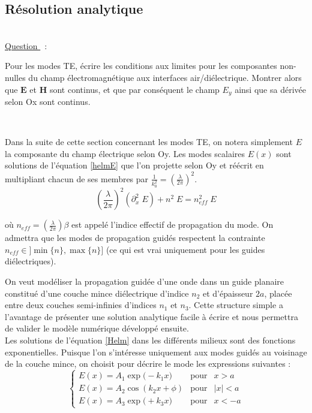 \documentclass[a4paper, 12pt]{article}
\newcounter{nquestion}
\newenvironment{question}[1]{
	\refstepcounter{nquestion}
	\vspace{2mm}\\
	\noindent \underline{Question \thenquestion}~:\vspace{-3mm}
	\begin{leftbar} \noindent #1}
	{\end{leftbar} \vspace{2mm}\\}
\begin{document}
\subsection{Résolution analytique}

\begin{question}
Pour les modes TE, écrire les conditions aux limites pour les composantes non-nulles du champ électromagnétique aux interfaces air/diélectrique. Montrer alors que $\textbf{E}$ et $ \textbf{H}$ sont continus, et que par conséquent le champ $E_y$ ainsi que sa dérivée selon Ox sont continus.
\end{question}

Dans la suite de cette section concernant les modes TE, on notera simplement $E$ la composante du champ électrique selon Oy. Les modes scalaires $E(x)$ sont solutions de  l'équation \eqref{helmE} que l'on projette selon Oy et réécrit  en multipliant chacun de ses membres par $\frac{1}{k_0^2}=\left(\frac{\lambda}{2 \pi} \right)^2$.
\begin{equation}
\left(\frac{\lambda}{2 \pi} \right)^2 \left(\partial_x^2 \; E \right)  + n^2 \; E=n_{ef\!f}^2 \; E
\label{Helm}
\end{equation}

\noindent où $n_{ef\!f} = \left(\frac{\lambda}{2 \pi} \right) \beta$ est appelé l'indice effectif de propagation du mode. On admettra que les modes de propagation guidés respectent la contrainte $n_{ef\!f} \in ]\min \{n \}, \max \{n \}]$ (ce qui est vrai uniquement pour les guides diélectriques).

On veut modéliser la propagation guidée d'une onde dans un guide planaire constitué d'une couche mince diélectrique d'indice $n_2$ et d'épaisseur $2a$, placée entre deux couches semi-infinies d'indices $n_1$ et $n_3$. Cette structure simple a l'avantage de présenter une solution analytique facile à écrire et nous permettra de valider le modèle numérique développé ensuite.\\

Les solutions de l'équation \eqref{Helm} dans les différents milieux sont des fonctions exponentielles. Puisque l'on s'intéresse uniquement aux modes guidés au voisinage de la couche mince, on choisit pour décrire le mode les expressions suivantes :
\begin{equation} \label{eq:ETE}
\left\{
  \begin{array}{lcl}
E(x)=A_1\exp \big(-k_1 x \big)  & \text{pour} &  x>a \\
E(x)=A_2\cos(k_2 x + \phi)  & \text{pour} & |x|<a \\
E(x)=A_3\exp \big(+k_3 x \big)   &\text{pour}  & x<-a
  \end{array}
\right.
\end{equation}
\end{document}
